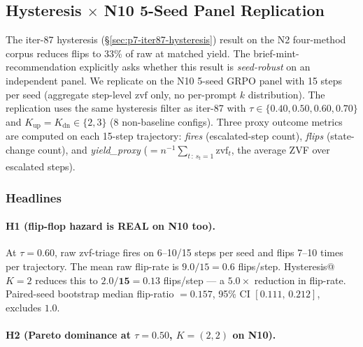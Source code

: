 \subsection{Hysteresis \texorpdfstring{$\times$}{x} N10 5-Seed Panel Replication}
\label{sec:p7-hysteresis-n10}

The iter-87 hysteresis (\S\ref{sec:p7-iter87-hysteresis}) result on the
N2 four-method corpus reduces flips to 33\% of raw at matched yield. The
brief-mint-recommendation explicitly asks whether this result is
\emph{seed-robust} on an independent panel. We replicate on the N10
5-seed GRPO panel with 15 steps per seed (aggregate step-level $\mathrm{zvf}$
only, no per-prompt $k$ distribution). The replication uses the same
hysteresis filter as iter-87 with $\tau \in \{0.40, 0.50, 0.60, 0.70\}$
and $K_\text{up} = K_\text{dn} \in \{2, 3\}$ (8 non-baseline configs).
Three proxy outcome metrics are computed on each 15-step trajectory:
\emph{fires} (escalated-step count), \emph{flips} (state-change count),
and \emph{yield\_proxy} ($= n^{-1} \sum_{t\,:\,s_t=1} \mathrm{zvf}_t$,
the average ZVF over escalated steps).

\subsubsection{Headlines}

\paragraph{H1 (flip-flop hazard is REAL on N10 too).}
At $\tau = 0.60$, raw zvf-triage fires on 6--10/15 steps per seed and flips
7--10 times per trajectory. The mean raw flip-rate is
$9.0/15 = 0.6$ flips/step. Hysteresis@$K{=}2$ reduces this to
$\mathbf{2.0/15 = 0.13}$ flips/step — a $\mathbf{5.0\times}$ reduction
in flip-rate. Paired-seed bootstrap median flip-ratio $\mathbf{= 0.157}$,
95\% CI $[0.111,\, 0.212]$, excludes $1.0$.

\paragraph{H2 (Pareto dominance at $\tau = 0.50$, $K = (2,2)$ on N10).}

